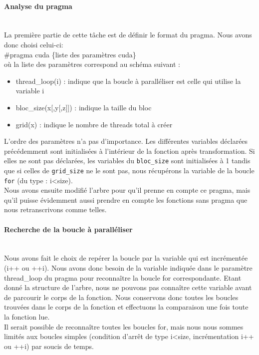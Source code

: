 \documentclass{article}
\begin{document}
	\paragraph{Analyse du pragma}
	~~\\
	\indent
	La première partie de cette tâche est de définir le format du pragma. Nous avons donc choisi celui-ci:
	\\\#pragma cuda \{liste des paramètres cuda\}
	\\où la liste des paramètres correspond au schéma suivant :
	\begin{itemize}
		\item thread\_loop(i) : indique que la boucle à paralléliser est celle qui utilise la variable i
		\item bloc\_size(x[,y[,z]]) : indique la taille du bloc
		\item grid(x) : indique le nombre de threads total à créer
	\end{itemize}
	L'ordre des paramètres n'a pas d'importance.
	Les différentes variables déclarées précédemment sont initialisées à l'intérieur de la fonction après transformation.
	Si elles ne sont pas déclarées, les variables du \verb|bloc_size| sont initialisées à 1 tandis que si celles de \verb|grid_size| ne le sont pas, nous récupérons la variable de la boucle \verb|for| (du type : i\textless size).
	\\Nous avons ensuite modifié l'arbre pour qu'il prenne en compte ce pragma, mais qu'il puisse évidemment aussi prendre en compte les fonctions sans pragma que nous retranscrivons comme telles.
		
	
	\paragraph{Recherche de la boucle à paralléliser}
	~~\\
	\indent
	Nous avons fait le choix de repérer la boucle par la variable qui est incrémentée (i++ ou ++i). Nous avons donc besoin de la variable indiquée dans le paramètre thread\_loop du pragma pour reconnaître la boucle for correspondante. Etant donné la structure de l'arbre, nous ne pouvons pas connaître cette variable avant de parcourir le corps de la fonction. Nous conservons donc toutes les boucles trouvées dans le corps de la fonction et effectuons la comparaison une fois toute la fonction lue.
	\\Il serait possible de reconnaître toutes les boucles for, mais nous nous sommes limités aux boucles simples (condition d'arrêt de type i\textless size, incrémentation i++ ou ++i) par soucis de temps.
	
\end{document}
